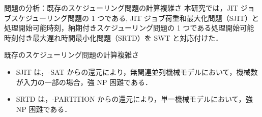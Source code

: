 \documentclass[dvipdfmx]{beamer}
\begin{document}
    \begin{frame}{問題の分析：既存のスケジューリング問題の計算複雑さ}
      本研究では，JIT ジョブスケジューリング問題の 1 つである,
      \alert{JIT ジョブ荷重和最大化問題（SJIT）}と 処理開始可能時刻，納期付きスケジューリング問題の 1 つである\alert{処理開始可能時刻付き最大遅れ時間最小化問題（SRTD）}を SWT と対応付けた．
      \begin{block}{既存のスケジューリング問題の計算複雑さ}
        \begin{itemize}
          \item SJIT は，{-SAT} からの還元により，無関連並列機械モデルにおいて，機械数が入力の一部の場合，\alert{強 NP 困難}である．
          \item SRTD は，{-PARTITION} からの還元により，単一機械モデルにおいて，\alert{強 NP  困難}である．
        \end{itemize}
      \end{block}
    \end{frame}
\end{document}
